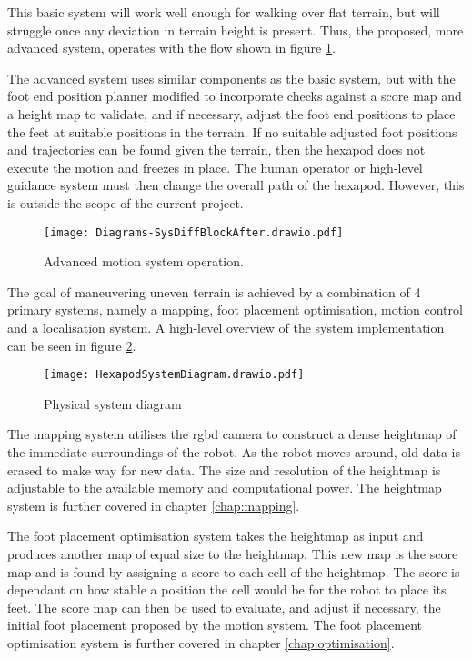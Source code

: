 \noindent
This basic system will work well enough for walking over flat terrain, but will struggle once any
deviation in terrain height is present. Thus, the proposed, more advanced system, operates with the flow shown in figure \ref{fig:adv_sys}.

The advanced system uses similar components as the basic system, but with the foot end position planner modified to incorporate
checks against a score map and a height map to validate, and if necessary, adjust the foot 
end positions to place the feet at suitable positions in the  terrain. If no suitable adjusted foot positions and trajectories
can be found given the terrain, then the hexapod does not execute the motion and freezes in place. The human operator or
high-level guidance system must then change the overall path of the hexapod. However, this is outside the scope of the current
project.

\newpage
\begin{figure}[h]
    \centering
    \texttt{[image: Diagrams-SysDiffBlockAfter.drawio.pdf]}
    \caption{Advanced motion system operation.}
    \label{fig:adv_sys}
\end{figure}

\noindent
The goal of maneuvering uneven terrain is achieved by a combination of 4 primary systems, namely a mapping, 
foot placement optimisation, motion control and a localisation system. A high-level overview of the system implementation can be seen
in figure \ref{fig:system_diagram}.
\begin{figure}[h]
    \centering
    \texttt{[image: HexapodSystemDiagram.drawio.pdf]}
    \caption{Physical system diagram}
    \label{fig:system_diagram}
\end{figure}

\noindent
The mapping system utilises the \ac*{rgbd} camera to construct a dense heightmap of the immediate surroundings of the robot. As the robot moves around, old data is erased to make way for new data. The size and resolution of the heightmap is adjustable to the available memory and computational power. The heightmap system is further covered in chapter \ref{chap:mapping}.

The foot placement optimisation system takes the heightmap as input and produces another map of equal size to the heightmap. This new map is the score map and is found by assigning a score to each cell of the heightmap. The score is dependant on how stable a position the cell would be for the robot to place its feet. The score map can then be used to evaluate, and adjust if necessary, the initial foot placement proposed by the motion system. The foot placement optimisation system is further covered in chapter \ref{chap:optimisation}.

